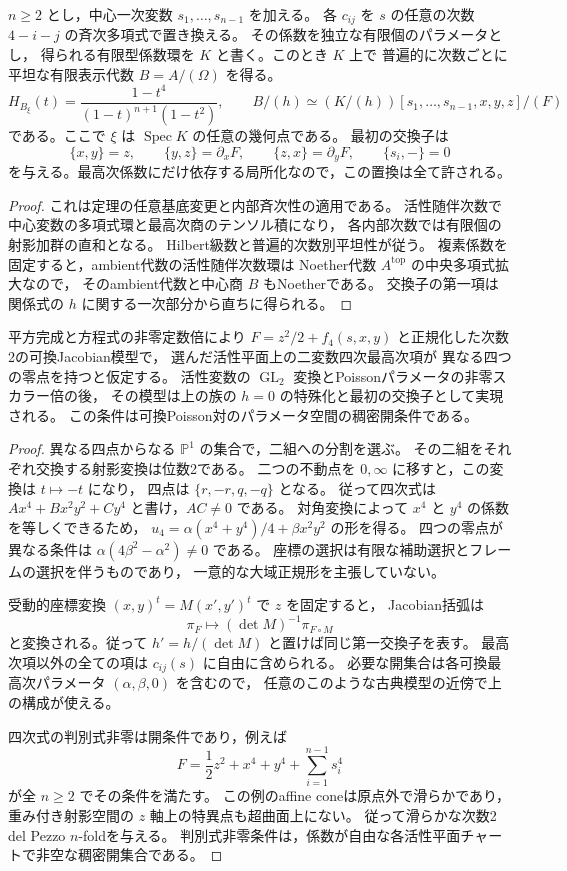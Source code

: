 \begin{corollary}\label{cor:elliptic-general-dimension}
$n\ge2$ とし，中心一次変数 $s_1,\ldots,s_{n-1}$ を加える。
各 $c_{ij}$ を $s$ の任意の次数 $4-i-j$ の斉次多項式で置き換える。
その係数を独立な有限個のパラメータとし，
得られる有限型係数環を $K$ と書く。このとき $K$ 上で
普遍的に次数ごとに平坦な有限表示代数 $B=A/(\Omega)$ を得る。
\[
 H_{B_\xi}(t)=\frac{1-t^4}{(1-t)^{n+1}(1-t^2)},\qquad
 B/(h)\simeq (K/(h))[s_1,\ldots,s_{n-1},x,y,z]/(F)
\]
である。ここで $\xi$ は $\operatorname{Spec}K$ の任意の幾何点である。
最初の交換子は
\[
 \{x,y\}=z,\qquad \{y,z\}=\partial_xF,
 \qquad\{z,x\}=\partial_yF,\qquad\{s_i,-\}=0
\]
を与える。最高次係数にだけ依存する局所化なので，この置換は全て許される。
\end{corollary}
\begin{proof}
これは定理の任意基底変更と内部斉次性の適用である。
活性随伴次数で中心変数の多項式環と最高次商のテンソル積になり，
各内部次数では有限個の射影加群の直和となる。
Hilbert級数と普遍的次数別平坦性が従う。
複素係数を固定すると，ambient代数の活性随伴次数環は
Noether代数 $A^{\mathrm{top}}$ の中央多項式拡大なので，
そのambient代数と中心商 $B$ もNoetherである。
交換子の第一項は関係式の $h$ に関する一次部分から直ちに得られる。
\end{proof}

\begin{proposition}\label{prop:elliptic-semiclassical-coverage}
平方完成と方程式の非零定数倍により
$F=z^2/2+f_4(s,x,y)$ と正規化した次数2の可換Jacobian模型で，
選んだ活性平面上の二変数四次最高次項が
異なる四つの零点を持つと仮定する。
活性変数の $\operatorname{GL}_2$ 変換とPoissonパラメータの非零スカラー倍の後，
その模型は上の族の $h=0$ の特殊化と最初の交換子として実現される。
この条件は可換Poisson対のパラメータ空間の稠密開条件である。
\end{proposition}
\begin{proof}
異なる四点からなる $\mathbb P^1$ の集合で，二組への分割を選ぶ。
その二組をそれぞれ交換する射影変換は位数2である。
二つの不動点を $0,\infty$ に移すと，この変換は $t\mapsto-t$ になり，
四点は $\{r,-r,q,-q\}$ となる。
従って四次式は $Ax^4+Bx^2y^2+Cy^4$ と書け，$AC\ne0$ である。
対角変換によって $x^4$ と $y^4$ の係数を等しくできるため，
$u_4=\alpha(x^4+y^4)/4+\beta x^2y^2$ の形を得る。
四つの零点が異なる条件は $\alpha(4\beta^2-\alpha^2)\ne0$ である。
座標の選択は有限な補助選択とフレームの選択を伴うものであり，
一意的な大域正規形を主張していない。

受動的座標変換 $(x,y)^t=M(x',y')^t$ で $z$ を固定すると，
Jacobian括弧は
\[
 \pi_F\longmapsto (\det M)^{-1}\pi_{F\circ M}
\]
と変換される。従って $h'=h/(\det M)$ と置けば同じ第一交換子を表す。
最高次項以外の全ての項は $c_{ij}(s)$ に自由に含められる。
必要な開集合は各可換最高次パラメータ $(\alpha,\beta,0)$ を含むので，
任意のこのような古典模型の近傍で上の構成が使える。

四次式の判別式非零は開条件であり，例えば
\[
 F=\frac12z^2+x^4+y^4+\sum_{i=1}^{n-1}s_i^4
\]
が全 $n\ge2$ でその条件を満たす。
この例のaffine coneは原点外で滑らかであり，
重み付き射影空間の $z$ 軸上の特異点も超曲面上にない。
従って滑らかな次数2 del Pezzo $n$-foldを与える。
判別式非零条件は，係数が自由な各活性平面チャートで非空な稠密開集合である。
\end{proof}

